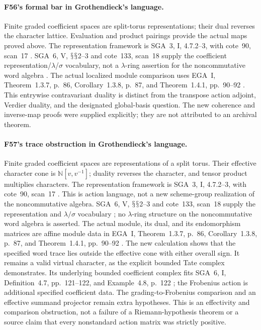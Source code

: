 \documentclass[11pt,a4paper]{article}
\renewcommand{\S}{\ensuremath{\mathsection}}
\newcommand{\fid}[1]{\textsf{#1}}\newcommand{\gate}[1]{\textsf{#1}}
\theoremstyle{named}\newtheorem{finding}{Finding}[section]
\theoremstyle{definition}\newtheorem{definition}[finding]{Definition}
\theoremstyle{remark}\newtheorem{remark}[finding]{Remark}
\begin{document}
\paragraph{\fid{F56}'s formal bar in Grothendieck's language.}
Finite graded coefficient spaces are split-torus
representations; their dual reverses the character lattice.
Evaluation and product pairings provide the actual maps
proved above. The representation framework is SGA~3,
I, 4.7.2--3, with cote~90, scan~17 \cite{SGA3,Archive}.
SGA~6, V, \S\S2--3 and cote~133, scan~18 supply the
coefficient representation/$\lambda$/$\sigma$ vocabulary,
not a $\lambda$-ring assertion for the noncommutative
word algebra \cite{SGA6,Archive}.
The actual localized module comparison uses EGA~I,
Theorem~1.3.7, p.~86, Corollary~1.3.8, p.~87, and
Theorem~1.4.1, pp.~90--92 \cite{EGA}.
This entrywise contravariant duality is distinct from
the transpose action adjoint, Verdier duality, and the
designated global-basis question. The new coherence and
inverse-map proofs were supplied explicitly; they are
not attributed to an archival theorem.

\paragraph{\fid{F57}'s trace obstruction in Grothendieck's language.}
Finite graded coefficient spaces are representations of
a split torus. Their effective character cone is
\(\mathbb N[v,v^{-1}]\); duality reverses the character,
and tensor product multiplies characters.
The representation framework is SGA~3,
I, 4.7.2--3, with cote~90, scan~17 \cite{SGA3,Archive}.
This is action language, not a new scheme-group realization
of the noncommutative algebra.
SGA~6, V, \S\S2--3 and cote~133, scan~18 supply the
representation and \(\lambda/\sigma\) vocabulary
\cite{SGA6,Archive}; no \(\lambda\)-ring structure on the
noncommutative word algebra is asserted.
The actual module, its dual, and its endomorphism matrices
are affine module data in EGA~I, Theorem~1.3.7, p.~86,
Corollary~1.3.8, p.~87, and Theorem~1.4.1,
pp.~90--92 \cite{EGA}.
The new calculation shows that the specified word trace
lies outside the effective cone with either overall sign.
It remains a valid virtual character, as the explicit
bounded Tate complex demonstrates. Its underlying bounded
coefficient complex fits SGA~6, I, Definition~4.7,
pp.~121--122, and Example~4.8, p.~122 \cite{SGA6};
the Frobenius action is additional specified coefficient data.
The grading-to-Frobenius comparison and an effective
summand projector remain extra hypotheses.
This is an effectivity
and comparison obstruction, not a failure of a
Riemann-hypothesis theorem or a source claim that every
nonstandard action matrix was strictly positive.
\end{document}
